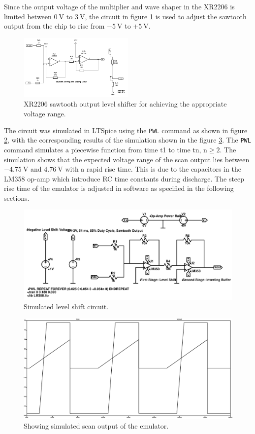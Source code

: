 \documentclass[class=report,11pt,crop=false]{standalone}
\begin{document}
	Since the output voltage of the multiplier and wave shaper in the XR2206 is limited between $\SI{0}{\volt}$ to $\SI{3}{\volt}$, the circuit in figure \ref{fig:emulator-circuit-level-shift} is used to adjust the sawtooth output from the chip to rise from $-\SI{5}{\volt}$ to $+\SI{5}{\volt}$.
	
	\begin{figure}[ht!]
		\centering
		\includegraphics[width=0.50\textwidth]{Figures/Methodology/hp8552b-horizontal-output-level-shifter-3}
		\caption{XR2206 sawtooth output level shifter for achieving the appropriate voltage range.}
		\label{fig:emulator-circuit-level-shift}
	\end{figure}
	The circuit was simulated in LTSpice using the \texttt{PWL} command as shown in figure \ref{fig:sawtooth-sim-ltspice}, with the corresponding results of the simulation shown in the figure \ref{fig:sawtooth-sim-output}. The \texttt{PWL} command simulates a piecewise function from time t1 to time tn, $\text{n}\geq 2$. The simulation shows that the expected voltage range of the scan output lies between $-\SI{4.75}{\volt}$ and $\SI{4.76}{\volt}$ with a rapid rise time. This is due to the capacitors in the LM358 op-amp which introduce RC time constants during discharge. The steep rise time of the emulator is adjusted in software as specified in the following sections. 
	
	\begin{figure}[ht!]
		\centering
		\includegraphics[width=0.55\linewidth]{Figures/Methodology/emulator-triangle-shift-ct-sim}
		\caption{Simulated level shift circuit.}
		\label{fig:sawtooth-sim-ltspice}
	\end{figure}

	\begin{figure}
		\centering
		\includegraphics[width=0.7\linewidth]{Figures/Methodology/emulator-sawtooth-output}
		\caption{Showing simulated scan output of the emulator.}
		\label{fig:sawtooth-sim-output}
	\end{figure}
\end{document}
